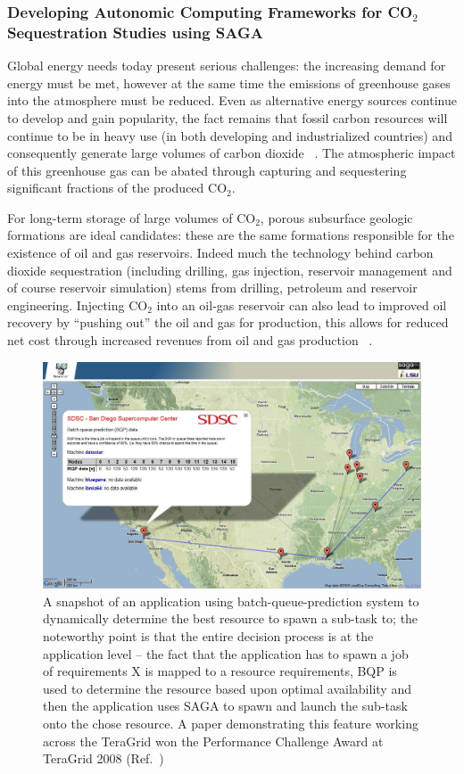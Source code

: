 \documentclass[a4paper,10pt]{article}
\begin{document}
\subsubsection*{Developing Autonomic Computing Frameworks for CO$_2$ Sequestration Studies using SAGA}

Global energy needs today present serious challenges: the increasing demand for energy must be met, however at the same time the emissions of greenhouse gases into the atmosphere must be reduced. Even as alternative energy sources continue to develop and gain popularity, the fact remains that fossil carbon resources will continue to be in heavy use (in both developing and industrialized countries) and consequently generate large volumes of carbon dioxide ~\cite{GeoRPT}. The atmospheric impact of this greenhouse gas can be abated through capturing and sequestering significant fractions of the produced CO$_2$.

For long-term storage of large volumes of CO$_2$, porous subsurface geologic formations are ideal candidates: these are the same formations responsible for the existence of oil and gas reservoirs. Indeed much the technology behind carbon dioxide sequestration (including drilling, gas injection, reservoir management and of course reservoir simulation) stems from drilling, petroleum and reservoir engineering. Injecting CO$_2$ into an oil-gas reservoir can also lead to improved oil recovery by ``pushing out'' the oil and gas for production, this allows for reduced net cost through increased revenues from oil and gas production ~\cite{EORBook}.

\begin{figure}
\begin{center}
\includegraphics[scale=0.33]{gmaps_bqp.jpg}
\end{center}
\caption{A snapshot of an application using batch-queue-prediction system to dynamically determine the best resource to spawn a sub-task to; the noteworthy point is that the entire decision process is at the application level -- the fact that the application has to spawn a job of requirements X is mapped to a resource requirements, BQP is used to determine the resource based upon optimal availability and then the application uses SAGA to spawn and launch the sub-task onto the chose resource. A paper demonstrating this feature working across the TeraGrid won the Performance Challenge Award at TeraGrid 2008 (Ref.~\cite{teragrid08})}
\label{}
\end{figure}
\end{document}
